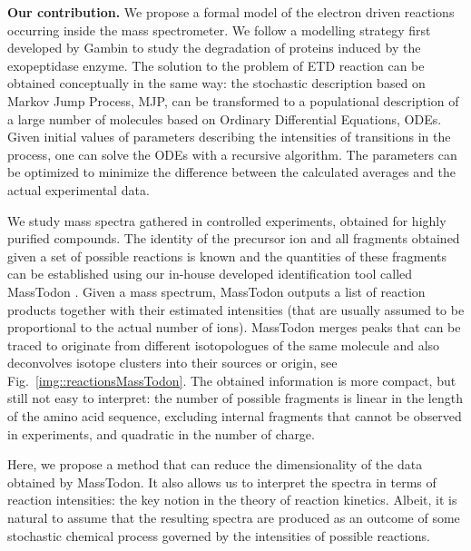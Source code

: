 \documentclass{llncs}
\begin{document}
\textbf{Our contribution.}
We propose a formal model of the electron driven reactions occurring inside the mass spectrometer. We follow a modelling strategy first developed by Gambin \cite{Gambin2010} to study the degradation of proteins induced by the exopeptidase enzyme.
The solution to the problem of ETD reaction can be obtained conceptually in the same way: the stochastic description based on Markov Jump Process, MJP, can be transformed to a populational description of a large number of molecules based on Ordinary Differential Equations, ODEs.
Given initial values of parameters describing the intensities of transitions in the process, one can solve the ODEs with a recursive algorithm. The parameters can be optimized to minimize the difference between the calculated averages and the actual experimental data.

We study mass spectra gathered in controlled experiments, obtained for highly purified compounds. The identity of the precursor ion and all fragments obtained given a set of possible reactions is known and the quantities of these fragments can be established using our in-house developed identification tool called {\sc MassTodon} \cite{Lermyte2015-lm,Lermyte2017-zt}. Given a mass spectrum, {\sc MassTodon} outputs a list of reaction products together with their estimated intensities (that are usually assumed to be proportional to the actual number of ions). {\sc MassTodon} merges peaks that can be traced to originate from different isotopologues of the same molecule and also deconvolves isotope clusters into their sources or origin, see Fig.~\ref{img::reactionsMassTodon}.
The obtained information is more compact, but still not easy to interpret: the number of possible fragments is linear in the length of the amino acid sequence, excluding internal fragments that cannot be observed in experiments, and quadratic in the number of charge.

Here, we propose a method that can reduce the dimensionality of the data obtained by {\sc MassTodon}. It also allows us to interpret the spectra in terms of reaction intensities: the key notion in the theory of reaction kinetics. Albeit, it is natural to assume that the resulting spectra are produced as an outcome of some stochastic chemical process governed by the intensities of possible reactions.
\end{document}

